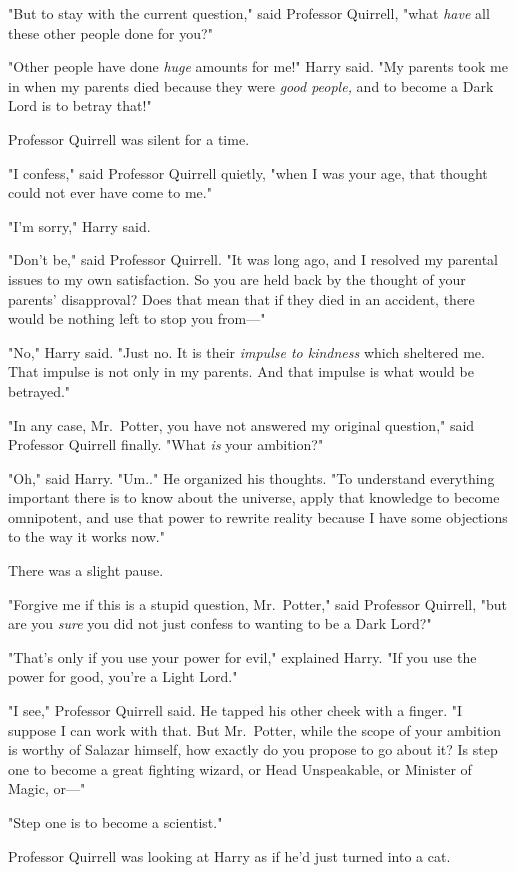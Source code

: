"But to stay with the current question," said Professor Quirrell, "what \emph{have} all these other people done for you?"

"Other people have done \emph{huge} amounts for me!" Harry said. "My parents took me in when my parents died because they were \emph{good people,} and to become a Dark Lord is to betray that!"

Professor Quirrell was silent for a time.

"I confess," said Professor Quirrell quietly, "when I was your age, that thought could not ever have come to me."

"I'm sorry," Harry said.

"Don't be," said Professor Quirrell. "It was long ago, and I resolved my parental issues to my own satisfaction. So you are held back by the thought of your parents' disapproval? Does that mean that if they died in an accident, there would be nothing left to stop you from---"

"No," Harry said. "Just no. It is their \emph{impulse to kindness} which sheltered me. That impulse is not only in my parents. And that impulse is what would be betrayed."

"In any case, Mr.~Potter, you have not answered my original question," said Professor Quirrell finally. "What \emph{is} your ambition?"

"Oh," said Harry. "Um.." He organized his thoughts. "To understand everything important there is to know about the universe, apply that knowledge to become omnipotent, and use that power to rewrite reality because I have some objections to the way it works now."

There was a slight pause.

"Forgive me if this is a stupid question, Mr.~Potter," said Professor Quirrell, "but are you \emph{sure} you did not just confess to wanting to be a Dark Lord?"

"That's only if you use your power for evil," explained Harry. "If you use the power for good, you're a Light Lord."

"I see," Professor Quirrell said. He tapped his other cheek with a finger. "I suppose I can work with that. But Mr.~Potter, while the scope of your ambition is worthy of Salazar himself, how exactly do you propose to go about it? Is step one to become a great fighting wizard, or Head Unspeakable, or Minister of Magic, or---"

"Step one is to become a scientist."

Professor Quirrell was looking at Harry as if he'd just turned into a cat.

